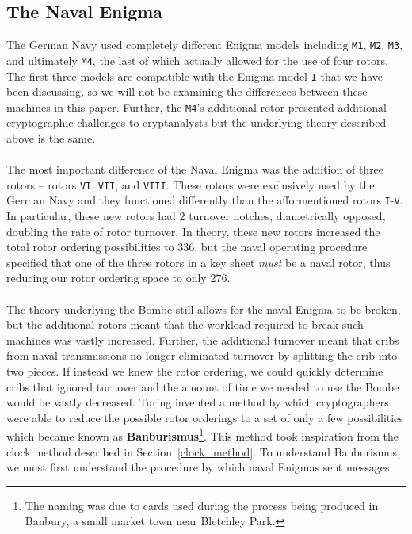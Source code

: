 \subsection{The Naval Enigma}
The German Navy used completely different Enigma models including
\texttt{M1}, \texttt{M2}, \texttt{M3}, and ultimately \texttt{M4},
the last of which actually allowed for the use of four rotors. The
first three models are compatible with the Enigma model \texttt{I}
that we have been discussing, so we will not be examining the
differences between these machines in this paper. Further, the
\texttt{M4}'s additional rotor presented additional cryptographic
challenges to cryptanalysts but the underlying theory described above
is the same.
\\\\The most important difference of the Naval Enigma was the
addition of three rotors -- rotors \texttt{VI}, \texttt{VII}, and
\texttt{VIII}. These rotors were exclusively used by the German Navy
and they functioned differently than the afformentioned rotors
\texttt{I}-\texttt{V}. In particular, these new rotors had $2$
turnover notches, diametrically opposed, doubling the rate of rotor turnover. In theory, these new rotors increased the total rotor
ordering possibilities to $336$, but the naval operating procedure
specified that one of the three rotors in a key sheet \emph{must} be
a naval rotor, thus reducing our rotor ordering space to only $276$.
\\\\The theory underlying the Bombe still allows for the naval Enigma
to be broken, but the additional rotors meant that the workload
required to break such machines was vastly increased. Further, the
additional turnover meant that cribs from naval transmissions no
longer eliminated turnover by splitting the crib into two pieces. If
instead we knew the rotor ordering, we could quickly determine cribs
that ignored turnover and the amount of time we needed to use the
Bombe would be vastly decreased. Turing invented a method by which
cryptographers
were able to reduce the possible rotor orderings to a set of only a
few possibilities which became known as {\bf{Banburismus}}\footnote{The
  naming was due to cards used during the process being produced in
Banbury, a small market town near Bletchley Park.}. This method took
inspiration from the clock method described in
Section~\ref{clock_method}. To understand Banburismus, we must first
understand the procedure by which naval Enigmas sent messages.
